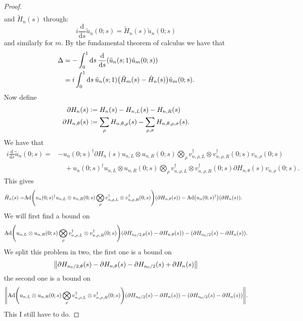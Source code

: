 \documentclass[12pt,a4paper,twoside]{article}
\renewcommand{\d}{\text{d}}
\newcommand{\defeq}{\vcentcolon=}
\let\originalleft\left
\let\originalright\right
\renewcommand{\left}{\mathopen{}\mathclose\bgroup\originalleft}
\renewcommand{\right}{\aftergroup\egroup\originalright}
\newcommand{\Ad}[1]{\textrm{Ad}\left(#1\right)}
\theoremstyle{definition}
\numberwithin{equation}{section}
\begin{document}
\begin{proof}
\begin{align}
 	\end{align}
 	and $\tilde{H}_n(s)$ through:
 	\begin{equation}
	 	i\frac{\d}{\d s}\tilde{u}_n(0;s)=\tilde{H}_n(s)\tilde{u}_n(0;s)
 	\end{equation}
 	and similarly for $m$. By the fundamental theorem of calculus we have that
 	\begin{align}
 		\Delta&=-\int_0^1\d s\:\frac{\d}{\d s}\left(\tilde{u}_n(s;1)\tilde{u}_m(0;s)\right)\\
 		&=i\int_0^1\d s \: \tilde{u}_n(s;1)\left(\tilde{H}_m(s)-\tilde{H}_n(s)\right)\tilde{u}_m(0;s).
 	\end{align}
 	Now define
 	\begin{align}
	 	\partial H_n(s)&\defeq H_n(s)- H_{n,L}(s)-H_{n,R}(s)\\
	 	\partial H_{n,\theta}(s)&\defeq \sum_\rho H_{n,\theta,\rho}(s)-\sum_{\rho,\sigma}H_{n,\theta,\rho,\sigma}(s).
 	\end{align}
 	We have that
 	\begin{align}
	 	i\frac{\d}{\d s}\tilde{u}_n(0;s)=&-u_n(0;s)^\dagger\partial H_n(s)u_{n,L}\otimes u_{n,R}(0;s) \bigotimes_\rho v_{n,\rho,L}^\dagger\otimes v_{n,\rho,R}^\dagger(0;s) v_{n,\rho}(0;s)\\
	 	\nonumber
	 	&\quad + u_n(0;s)^\dagger u_{n,L}\otimes u_{n,R}(0;s) \bigotimes_\rho v_{n,\rho,L}^\dagger\otimes v_{n,\rho,R}^\dagger(0;s) \partial H_{n,\theta}(s) v_{n,\rho}(0;s).
 	\end{align}
 	This gives
 	\begin{align}
	 	\tilde{H}_n(s)=& \Ad{u_n(0;s)^\dagger u_{n,L}\otimes u_{n,R}(0;s) \bigotimes_\rho v_{n,\rho,L}^\dagger\otimes v_{n,\rho,R}^\dagger(0;s)}\left(\partial H_{n,\theta}(s)\right) - \Ad{u_n(0;s)^\dagger}(\partial H_n(s)).
 	\end{align}
 	We will first find a bound on
 	\begin{equation}
 	\Ad{u_{n,L}\otimes u_{n,R}(0;s) \bigotimes_\rho v_{n,\rho,L}^\dagger\otimes v_{n,\rho,R}^\dagger(0;s)}(\partial H_{n_0/2,\theta}(s)-\partial H_{n,\theta}(s))-(\partial H_{n_0/2}(s)-\partial H_{n}(s)).
 	\end{equation}
 	We split this problem in two, the first one is a bound on
 	\begin{equation}
	 	\norm{\partial H_{n_0/2,\theta}(s)-\partial H_{n,\theta}(s)-\partial H_{n_0/2}(s)+\partial H_{n}(s)}
 	\end{equation}
 	the second one is a bound on
 	\begin{equation}
 	\norm{\Ad{u_{n,L}\otimes u_{n,R}(0;s) \bigotimes_\rho v_{n,\rho,L}^\dagger\otimes v_{n,\rho,R}^\dagger(0;s)}(\partial H_{n_0/2}(s)-\partial H_{n}(s))-(\partial H_{n_0/2}(s)-\partial H_{n}(s))}.
 	\end{equation}
 	{\color{red}This I still have to do.}
 \end{proof}
\end{document}
